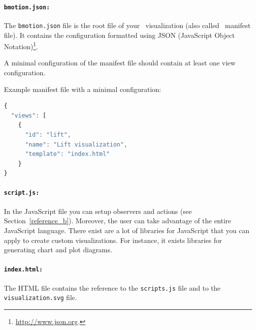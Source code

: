 \paragraph{\texttt{bmotion.json:}}
The \texttt{bmotion.json} file is the root file of your \bms\ visualization (also called \bms\ manifest file).
It contains the configuration formatted using JSON (JavaScript Object Notation)\footnote{\url{http://www.json.org}.}.


A minimal configuration of the manifest file should contain at least one view configuration.

Example manifest file with a minimal configuration:

\begin{lstlisting}[language=JavaScript]
{
  "views": [
    {
      "id": "lift",
      "name": "Lift visualization",
      "template": "index.html"
    }
}
\end{lstlisting}


\paragraph{\texttt{script.js:}}
In the JavaScript file you can setup observers and actions (see Section~\ref{reference_b}).
Moreover, the user can take advantage of the entire JavaScript language.
There exist are a lot of libraries for JavaScript that you can apply to create custom visualizations.
For instance, it exists libraries for generating chart and plot diagrams.


\paragraph{\texttt{index.html:}}
The HTML file contains the reference to the \texttt{scripts.js} file and to the \texttt{visualization.svg} file.

